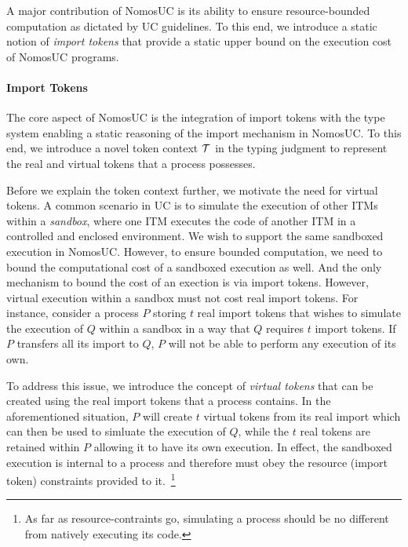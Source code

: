 A major contribution of NomosUC is its ability to ensure resource-bounded computation
as dictated by UC guidelines.
To this end, we introduce a static notion of \emph{import tokens} that provide a static upper
bound on the execution cost of NomosUC programs.

\paragraph*{\textbf{Import Tokens}}
The core aspect of NomosUC is the integration of import tokens with the type system
enabling a static reasoning of the import mechanism in NomosUC.
To this end, we introduce a novel token context $\mathcal{T}$ in the typing judgment to
represent the real and virtual tokens that a process possesses.

Before we explain the token context further, we motivate the need for virtual tokens.
A common scenario in UC is to simulate the execution of other ITMs within a \emph{sandbox},
where one ITM executes the code of another ITM in a controlled and enclosed environment.
We wish to support the same sandboxed execution in NomosUC.
However, to ensure bounded computation, we need to bound the computational cost of a
sandboxed execution as well.
And the only mechanism to bound the cost of an exection is via import tokens.
However, virtual execution within a sandbox must not cost real import tokens.
For instance, consider a process $P$ storing $t$ real import tokens that wishes to
simulate the execution of $Q$ within a sandbox in a way that $Q$ requires $t$
import tokens.
If $P$ transfers all its import to $Q$, $P$ will not be able to perform any execution of its own.

To address this issue, we introduce the concept of \emph{virtual tokens} that can be
created using the real import tokens that a process contains.
In the aforementioned situation, $P$ will create $t$ virtual tokens from its real import
which can then be used to simluate the execution of $Q$, while the $t$ real tokens are retained within $P$
allowing it to have its own execution.
In effect, the sandboxed execution is internal to a process and therefore must obey the resource (import token)
constraints provided to it.~\footnote{As far as resource-contraints go, simulating a process should be no different
from natively executing its code.}

